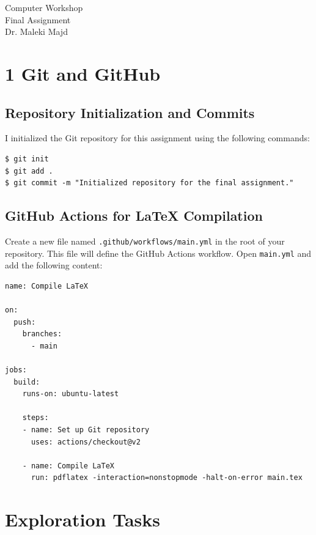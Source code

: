 \documentclass{article}
\begin{document}
\begin{titlepage}
    \centering
    \vspace*{\fill}
    \large{Computer Workshop \\
Final Assignment} \\

    \normalsize{Dr. Maleki Majd}
    \vspace*{\fill}
    \thispagestyle{empty}
\end{titlepage}



\tableofcontents
\clearpage

\section{1 Git and GitHub}
\subsection{ Repository Initialization and Commits}
I initialized the Git repository for this assignment using the following commands:
\begin{verbatim}
$ git init
$ git add .
$ git commit -m "Initialized repository for the final assignment."
\end{verbatim}

\subsection{GitHub Actions for LaTeX Compilation}
Create a new file named \texttt{.github/workflows/main.yml} in the root of your repository. This file will define the GitHub Actions workflow.
Open \texttt{main.yml} and add the following content:

\begin{verbatim}
name: Compile LaTeX

on:
  push:
    branches:
      - main

jobs:
  build:
    runs-on: ubuntu-latest

    steps:
    - name: Set up Git repository
      uses: actions/checkout@v2

    - name: Compile LaTeX
      run: pdflatex -interaction=nonstopmode -halt-on-error main.tex
\end{verbatim}

\section{Exploration Tasks}
\end{document}
